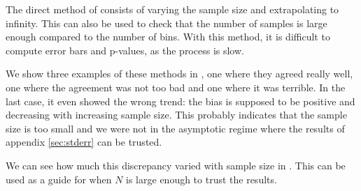 \documentclass[12pt]{article}
\begin{document}
The direct method of \cite{Strong1998} consists of varying the sample size and extrapolating to infinity. This can also be used to check that the number of samples is large enough compared to the number of bins. With this method, it is difficult to compute error bars and p-values, as the process is slow.

We show three examples of these methods in , one where they agreed really well, one where the agreement was not too bad and one where it was terrible. In the last case, it even showed the wrong trend: the bias is supposed to be positive and decreasing with increasing sample size. This probably indicates that the sample size is too small and we were not in the asymptotic regime where the results of appendix \ref{sec:stderr} can be trusted.

We can see how much this discrepancy varied with sample size in . This can be used as a guide for when $N$ is large enough to trust the results.
\end{document}
